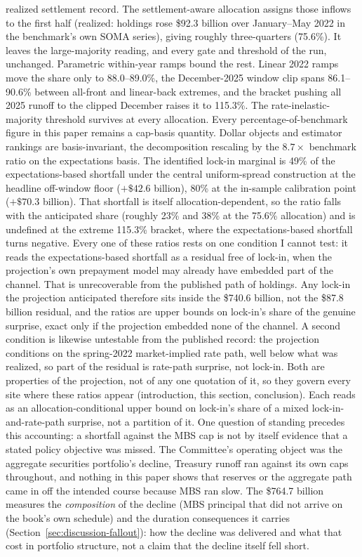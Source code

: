 \documentclass[12pt]{article}
\begin{document}
realized settlement record. The settlement-aware allocation assigns those inflows to the first half (realized: holdings rose \$92.3 billion over January--May 2022 in the benchmark's own SOMA series), giving roughly three-quarters (75.6\%). It leaves the large-majority reading, and every gate and threshold of the run, unchanged. Parametric within-year ramps bound the rest. Linear 2022 ramps move the share only to 88.0--89.0\%, the December-2025 window clip spans 86.1--90.6\% between all-front and linear-back extremes, and the bracket pushing all 2025 runoff to the clipped December raises it to 115.3\%. The rate-inelastic-majority threshold survives at every allocation. Every percentage-of-benchmark figure in this paper remains a cap-basis quantity. Dollar objects and estimator rankings are basis-invariant, the decomposition rescaling by the $8.7\times$ benchmark ratio on the expectations basis. The identified lock-in marginal is 49\% of the expectations-based shortfall under the central uniform-spread construction at the headline off-window floor ($+\$42.6$ billion), 80\% at the in-sample calibration point ($+\$70.3$ billion). That shortfall is itself allocation-dependent, so the ratio falls with the anticipated share (roughly 23\% and 38\% at the 75.6\% allocation) and is undefined at the extreme 115.3\% bracket, where the expectations-based shortfall turns negative. Every one of these ratios rests on one condition I cannot test: it reads the expectations-based shortfall as a residual free of lock-in, when the projection's own prepayment model may already have embedded part of the channel. That is unrecoverable from the published path of holdings. Any lock-in the projection anticipated therefore sits inside the \$740.6 billion, not the \$87.8 billion residual, and the ratios are upper bounds on lock-in's share of the genuine surprise, exact only if the projection embedded none of the channel. A second condition is likewise untestable from the published record: the projection conditions on the spring-2022 market-implied rate path, well below what was realized, so part of the residual is rate-path surprise, not lock-in. Both are properties of the projection, not of any one quotation of it, so they govern every site where these ratios appear (introduction, this section, conclusion). Each reads as an allocation-conditional upper bound on lock-in's share of a mixed lock-in-and-rate-path surprise, not a partition of it. One question of standing precedes this accounting: a shortfall against the MBS cap is not by itself evidence that a stated policy objective was missed. The Committee's operating object was the aggregate securities portfolio's decline, Treasury runoff ran against its own caps throughout, and nothing in this paper shows that reserves or the aggregate path came in off the intended course because MBS ran slow. The \$764.7 billion measures the \emph{composition} of the decline (MBS principal that did not arrive on the book's own schedule) and the duration consequences it carries (Section~\ref{sec:discussion-fallout}): how the decline was delivered and what that cost in portfolio structure, not a claim that the decline itself fell short.
\end{document}
